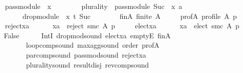 \begin{isabellebody}
\ \ \ \ {\isachardoublequoteopen}pass{\isacharunderscore}{\kern0pt}module\ {}\ x\ {\isasymtriangleright}\isanewline
\ \ \ \ \ \ \ {\isacharparenleft}{\kern0pt}{\isacharparenleft}{\kern0pt}plurality{\isasymdown}{\isacharparenright}{\kern0pt}\ {\isasymtriangleright}\ pass{\isacharunderscore}{\kern0pt}module\ {\isacharparenleft}{\kern0pt}Suc\ {}{\isacharparenright}{\kern0pt}\ x{\isacharparenright}{\kern0pt}\ {\isasymparallel}\isactrlsub {\isacharquery}{\kern0pt}a\isanewline
\ \ \ \ \ \ \ \ \ drop{\isacharunderscore}{\kern0pt}module\ {}\ x\ {\isasymcirclearrowleft}\isactrlsub {\isacharquery}{\kern0pt}t\ {\isacharparenleft}{\kern0pt}Suc\ {}{\isacharparenright}{\kern0pt}{\isachardoublequoteclose}\isanewline
\ \ \isamarkupfalse%
\isanewline
\ \ \ \ fin{\isacharunderscore}{\kern0pt}A{\isacharcolon}{\kern0pt}\ {\isachardoublequoteopen}finite\ A{\isachardoublequoteclose}\ \isanewline
\ \ \ \ prof{\isacharunderscore}{\kern0pt}A{\isacharcolon}{\kern0pt}\ {\isachardoublequoteopen}profile\ A\ p{\isachardoublequoteclose}\ \isanewline
\ \ \ \ reject{\isacharunderscore}{\kern0pt}xa{\isacharcolon}{\kern0pt}\isanewline
\ \ \ \ \ \ {\isachardoublequoteopen}xa\ {\isasymin}\ reject\ {\isacharparenleft}{\kern0pt}{\isacharquery}{\kern0pt}smc{\isacharparenright}{\kern0pt}\ A\ p{\isachardoublequoteclose}\ \isanewline
\ \ \ \ elect{\isacharunderscore}{\kern0pt}xa{\isacharcolon}{\kern0pt}\isanewline
\ \ \ \ \ \ {\isachardoublequoteopen}xa\ {\isasymin}\ elect\ {\isacharparenleft}{\kern0pt}{\isacharquery}{\kern0pt}smc{\isacharparenright}{\kern0pt}\ A\ p{\isachardoublequoteclose}\isanewline
\ \ \isamarkupfalse%
\ {\isachardoublequoteopen}False{\isachardoublequoteclose}\isanewline
\ \ \ \ \isamarkupfalse%
\ IntI\ drop{\isacharunderscore}{\kern0pt}mod{\isacharunderscore}{\kern0pt}sound\ elect{\isacharunderscore}{\kern0pt}xa\ emptyE\ fin{\isacharunderscore}{\kern0pt}A\isanewline
\ \ \ \ \ \ \ \ \ \ loop{\isacharunderscore}{\kern0pt}comp{\isacharunderscore}{\kern0pt}sound\ max{\isacharunderscore}{\kern0pt}agg{\isacharunderscore}{\kern0pt}sound\ order\ prof{\isacharunderscore}{\kern0pt}A\isanewline
\ \ \ \ \ \ \ \ \ \ par{\isacharunderscore}{\kern0pt}comp{\isacharunderscore}{\kern0pt}sound\ pass{\isacharunderscore}{\kern0pt}mod{\isacharunderscore}{\kern0pt}sound\ reject{\isacharunderscore}{\kern0pt}xa\isanewline
\ \ \ \ \ \ \ \ \ \ plurality{\isacharunderscore}{\kern0pt}sound\ result{\isacharunderscore}{\kern0pt}disj\ rev{\isacharunderscore}{\kern0pt}comp{\isacharunderscore}{\kern0pt}sound\isanewline

\end{isabellebody}

